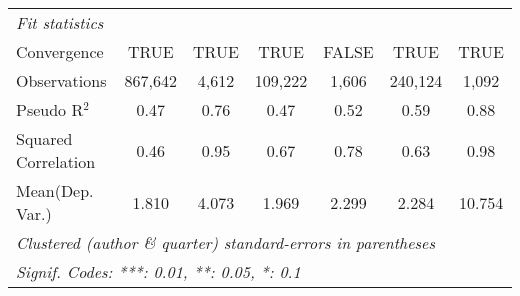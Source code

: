 \begin{tabular}{lcccccc}
   \midrule
   \emph{Fit statistics}\\
   Convergence                                                &TRUE           & TRUE    & TRUE          & FALSE       & TRUE          & TRUE\\  
   Observations                                               & 867,642       & 4,612   & 109,222       & 1,606       & 240,124       & 1,092\\  
   Pseudo R$^2$                                               & 0.47          & 0.76    & 0.47          & 0.52        & 0.59          & 0.88\\  
   Squared Correlation                                        & 0.46          & 0.95    & 0.67          & 0.78        & 0.63          & 0.98\\  
Mean(Dep. Var.) & 1.810 & 4.073 & 1.969 & 2.299 & 2.284 & 10.754 \\
   \midrule \midrule
   \multicolumn{7}{l}{\emph{Clustered (author \& quarter) standard-errors in parentheses}}\\
   \multicolumn{7}{l}{\emph{Signif. Codes: ***: 0.01, **: 0.05, *: 0.1}}\\
\end{tabular}
\par\endgroup
